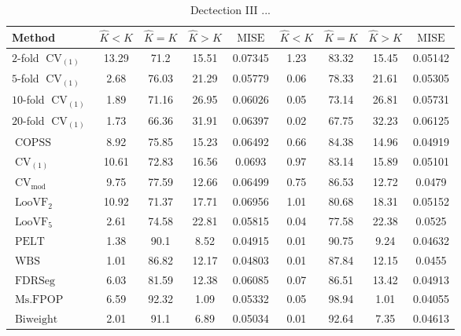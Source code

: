 \begin{table}[ht]
\centering
\begin{tabular}{|l|cccc|cccc|}
  \hline
Method & $\hat{K} < K$ & $\hat{K} = K$ & $\hat{K} > K$ & $\operatorname{MISE}$ & $\hat{K} < K$ & $\hat{K} = K$ & $\hat{K} > K$ & $\operatorname{MISE}$ \\ 
  \hline
$2$-fold $\operatorname{CV}_{(1)}$ & 13.29 &  71.2 & 15.51 & 0.07345 &  1.23 & 83.32 & 15.45 & 0.05142 \\ 
  $5$-fold $\operatorname{CV}_{(1)}$ &  2.68 & 76.03 & 21.29 & 0.05779 &  0.06 & 78.33 & 21.61 & 0.05305 \\ 
  $10$-fold $\operatorname{CV}_{(1)}$ &  1.89 & 71.16 & 26.95 & 0.06026 &  0.05 & 73.14 & 26.81 & 0.05731 \\ 
  $20$-fold $\operatorname{CV}_{(1)}$ &  1.73 & 66.36 & 31.91 & 0.06397 &  0.02 & 67.75 & 32.23 & 0.06125 \\ 
  $\operatorname{COPSS}$ &  8.92 & 75.85 & 15.23 & 0.06492 &  0.66 & 84.38 & 14.96 & 0.04919 \\ 
  $\operatorname{CV}_{(1)}$ & 10.61 & 72.83 & 16.56 & 0.0693 &  0.97 & 83.14 & 15.89 & 0.05101 \\ 
  $\operatorname{CV}_{\operatorname{mod}}$ &  9.75 & 77.59 & 12.66 & 0.06499 &  0.75 & 86.53 & 12.72 & 0.0479 \\ 
  $\operatorname{LooVF}_2$ & 10.92 & 71.37 & 17.71 & 0.06956 &  1.01 & 80.68 & 18.31 & 0.05152 \\ 
  $\operatorname{LooVF}_5$ &  2.61 & 74.58 & 22.81 & 0.05815 &  0.04 & 77.58 & 22.38 & 0.0525 \\ 
  $\operatorname{PELT}$ &  1.38 &  90.1 &  8.52 & 0.04915 &  0.01 & 90.75 &  9.24 & 0.04632 \\ 
  $\operatorname{WBS}$ &  1.01 & 86.82 & 12.17 & 0.04803 &  0.01 & 87.84 & 12.15 & 0.0455 \\ 
  $\operatorname{FDRSeg}$ &  6.03 & 81.59 & 12.38 & 0.06085 &  0.07 & 86.51 & 13.42 & 0.04913 \\ 
  $\operatorname{Ms.FPOP}$ &  6.59 & 92.32 &  1.09 & 0.05332 &  0.05 & 98.94 &  1.01 & 0.04055 \\ 
  $\operatorname{Biweight}$ &  2.01 &  91.1 &  6.89 & 0.05034 &  0.01 & 92.64 &  7.35 & 0.04613 \\ 
   \hline
\end{tabular}
\caption{Dectection III ...} 
\end{table}
